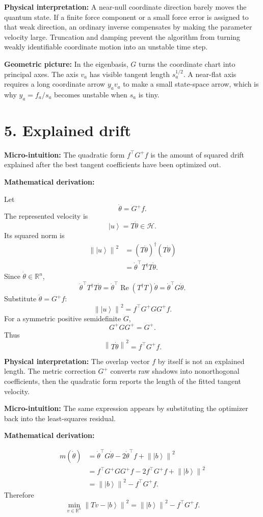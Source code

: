 \documentclass[10pt,twocolumn]{article}
\newcommand{\ket}[1]{\left|#1\right\rangle}
\newcommand{\norm}[1]{\left\lVert #1\right\rVert}
\newcommand{\R}{\mathbb R}
\newcommand{\Hh}{\mathcal H}
\newcommand{\Real}{\operatorname{Re}}
\newcommand{\micro}[1]{%
  \par\smallskip
  \noindent\textcolor{deepblue}{\textbf{Micro-intuition:}} #1
  \par\smallskip}
\newcommand{\deriv}{%
  \par\noindent\textcolor{deepviolet}{\textbf{Mathematical derivation:}}\par\vspace{-1mm}}
\newcommand{\phys}[1]{%
  \par\smallskip
  \noindent\textcolor{deepgreen}{\textbf{Physical interpretation:}} #1
  \par\smallskip}
\newcommand{\geom}[1]{%
  \par\smallskip
  \noindent\textcolor{deepviolet}{\textbf{Geometric picture:}} #1
  \par\smallskip}
\begin{document}
\phys{A near-null coordinate direction barely moves the quantum state. If a
finite force component or a small force error is assigned to that weak
direction, an ordinary inverse compensates by making the parameter velocity
large. Truncation and damping prevent the algorithm from turning weakly
identifiable coordinate motion into an unstable time step.}

\geom{In the eigenbasis, \(G\) turns the coordinate chart into principal axes.
The axis \(v_a\) has visible tangent length \(s_a^{1/2}\). A near-flat axis
requires a long coordinate arrow \(y_av_a\) to make a small state-space arrow,
which is why \(y_a=f_a/s_a\) becomes unstable when \(s_a\) is tiny.}

\section*{5. Explained drift}

\micro{The quadratic form \(f^\top G^+f\) is the amount of squared drift
explained after the best tangent coefficients have been optimized out.}

\deriv
Let
\[
\dot\theta=G^+f.
\]
The represented velocity is
\[
\ket u=T\dot\theta\in\Hh.
\]
Its squared norm is
\[
\begin{aligned}
\norm{\ket u}^2
&=(T\dot\theta)^\dagger(T\dot\theta)\\
&=\dot\theta^\top T^\dagger T\dot\theta.
\end{aligned}
\]
Since \(\dot\theta\in\R^n\),
\[
\dot\theta^\top T^\dagger T\dot\theta
=\dot\theta^\top\Real(T^\dagger T)\dot\theta
=\dot\theta^\top G\dot\theta.
\]
Substitute \(\dot\theta=G^+f\):
\[
\norm{\ket u}^2
=f^\top G^+GG^+f.
\]
For a symmetric positive semidefinite \(G\),
\[
G^+GG^+=G^+.
\]
Thus
\[
\boxed{\norm{T\dot\theta}^2=f^\top G^+f.}
\]

\phys{The overlap vector \(f\) by itself is not an explained length. The metric
correction \(G^+\) converts raw shadows into nonorthogonal coefficients, then
the quadratic form reports the length of the fitted tangent velocity.}

\micro{The same expression appears by substituting the optimizer back into the
least-squares residual.}

\deriv
\[
\begin{aligned}
m(\dot\theta)
&=\dot\theta^\top G\dot\theta-2\dot\theta^\top f+\norm{\ket b}^2\\
&=f^\top G^+GG^+f-2f^\top G^+f+\norm{\ket b}^2\\
&=\norm{\ket b}^2-f^\top G^+f.
\end{aligned}
\]
Therefore
\[
\boxed{
\min_{v\in\R^n}\norm{Tv-\ket b}^2
=
\norm{\ket b}^2-f^\top G^+f.
}
\]
\end{document}

